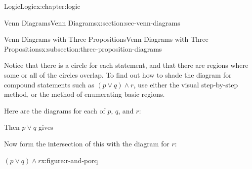 \documentclass[twoside,10pt,]{book}
\numberwithin{equation}{section}
\begin{document}
\begin{chapterptx}{Logic}{}{Logic}{}{}{x:chapter:logic}
\begin{sectionptx}{Venn Diagrams}{}{Venn Diagrams}{}{}{x:section:sec-venn-diagrams}
\begin{subsectionptx}{Venn Diagrams with Three Propositions}{}{Venn Diagrams with Three Propositions}{}{}{x:subsection:three-proposition-diagrams}
%
\par
Notice that there is a circle for each statement, and that there are regions where some or all of the circles overlap.  To find out how to shade the diagram for compound statements such as \((p {\vee} q) {\wedge} r\), use either the visual step-by-step method, or the method of enumerating basic regions.%
\par
Here are the diagrams for each of \(p\), \(q\), and \(r\):%
\par
\begin{sidebyside}{3}{0.1}{0.1}{0.025}%
\begin{sbspanel}{0.25}%
%
\end{sbspanel}%
\begin{sbspanel}{0.25}%
%
\end{sbspanel}%
\begin{sbspanel}{0.25}%
%
\end{sbspanel}%
\end{sidebyside}%
%
\par
Then \(p{\vee} q\) gives%
\par
\begin{image}{0.3}{0.4}{0.3}%
%
\end{image}%
%
\par
Now form the intersection of this with the diagram for \(r\):%
\par
\begin{figureptx}{\((p{\vee} q){\wedge} r\)}{x:figure:r-and-porq}{}%

\end{figureptx}
\end{subsectionptx}
\end{sectionptx}
\end{chapterptx}
\end{document}
